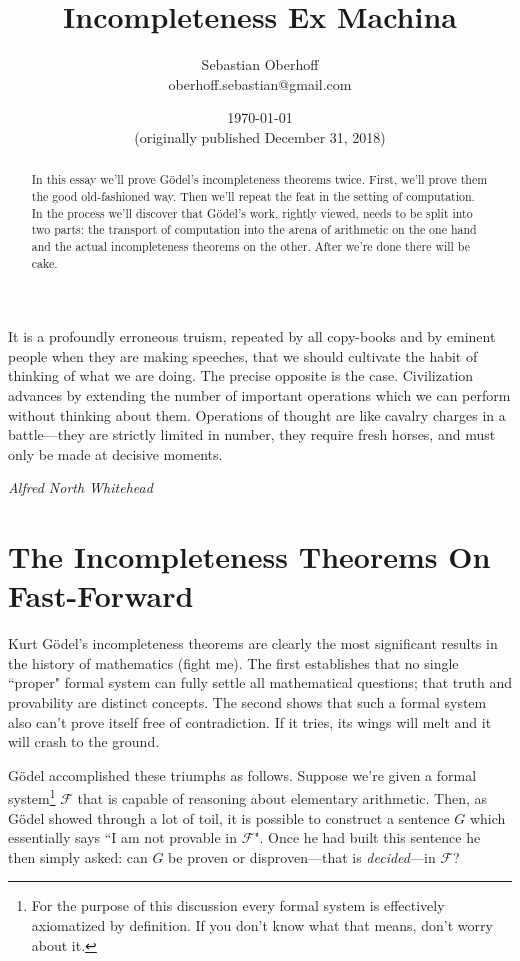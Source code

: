 \documentclass{article}
\newcommand{\F}{\ensuremath{\mathcal{F}}}
\begin{document}
\title{\vspace{-2.0cm}Incompleteness Ex Machina}
\author{Sebastian Oberhoff\\{\small oberhoff.sebastian@gmail.com}}
\date{\today\\{\small (originally published December 31, 2018)}}

\maketitle

\begin{abstract}
In this essay we'll prove Gödel's incompleteness theorems twice. First, we'll prove them the good old-fashioned way. Then we'll repeat the feat in the setting of computation. In the process we'll discover that Gödel's work, rightly viewed, needs to be split into two parts: the transport of computation into the arena of arithmetic on the one hand and the actual incompleteness theorems on the other. After we're done there will be cake.
\end{abstract}

\setlength{\epigraphwidth}{\textwidth}

\epigraph{It is a profoundly erroneous truism, repeated by all copy-books and by eminent people when they are making speeches, that we should cultivate the habit of thinking of what we are doing. The precise opposite is the case. Civilization advances by extending the number of important operations which we can perform without thinking about them. Operations of thought are like cavalry charges in a battle---they are strictly limited in number, they require fresh horses, and must only be made at decisive moments. }{\textit{Alfred North Whitehead}}

\section{The Incompleteness Theorems On Fast-Forward}

Kurt Gödel's incompleteness theorems are clearly the most significant results in the history of mathematics (fight me). The first establishes that no single ``proper" formal system can fully settle all mathematical questions; that truth and provability are distinct concepts. The second shows that such a formal system also can't prove itself free of contradiction. If it tries, its wings will melt and it will crash to the ground.

Gödel accomplished these triumphs as follows. Suppose we're given a formal system\footnote{For the purpose of this discussion every formal system is effectively axiomatized by definition. If you don't know what that means, don't worry about it.} $\F$ that is capable of reasoning about elementary arithmetic. Then, as Gödel showed through a lot of toil, it is possible to construct a sentence $G$ which essentially says ``I am not provable in $\F$". Once he had built this sentence he then simply asked: can $G$ be proven or disproven---that is \textit{decided}---in $\F$?
\end{document}
